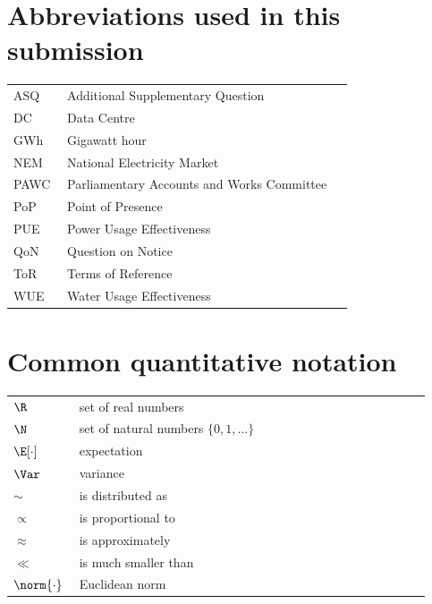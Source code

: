 \section{Abbreviations used in this submission}
\noindent
\begin{longtable}{p{0.15\linewidth} p{0.80\linewidth}}
    ASQ   & Additional Supplementary Question                       \\
    DC    & Data Centre                                             \\
    GWh   & Gigawatt hour                                           \\
    NEM   & National Electricity Market                             \\
    PAWC  & Parliamentary Accounts and Works Committee              \\
    PoP   & Point of Presence                                       \\
    PUE   & Power Usage Effectiveness                               \\
    QoN   & Question on Notice                                      \\
    ToR   & Terms of Reference                                      \\
    WUE   & Water Usage Effectiveness                               \\
\end{longtable}

\section{Common quantitative notation}
\noindent
\begin{longtable}{p{0.15\linewidth} p{0.80\linewidth}}
    $\R$            & set of real numbers                                  \\
    $\N$            & set of natural numbers $\{0, 1, \dots\}$             \\
    $\E[\cdot]$     & expectation                                          \\
    $\Var$          & variance                                             \\
    $\sim$          & is distributed as                                    \\
    $\propto$       & is proportional to                                   \\
    $\approx$       & is approximately                                     \\
    $\ll$           & is much smaller than                                 \\
    $\norm{\cdot}$  & Euclidean norm                                       \\
\end{longtable}
\clearpage
